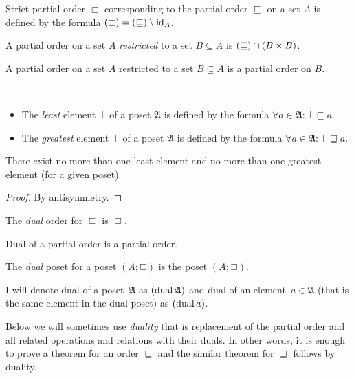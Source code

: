 \begin{defn}
Strict partial order $\sqsubset$ corresponding
to the partial order $\sqsubseteq$ on a set $A$ is defined by the
formula $\left(\mathord{\sqsubset}\right)=\left(\mathord{\sqsubseteq}\right)\setminus\operatorname{id}_{A}$.
\end{defn}

\begin{defn}
A partial order on a set $A$ \emph{restricted}
to a set $B\subseteq A$ is $\left(\mathord{\sqsubseteq}\right)\cap(B\times B)$.\end{defn}
\begin{obvious}
A partial order on a set $A$ restricted to a set $B\subseteq A$
is a partial order on $B$.\end{obvious}
\begin{defn}
~
\begin{itemize}
\item {}The \emph{least} element $\bot$ of a poset
$\mathfrak{A}$ is defined by the formula $\forall a\in\mathfrak{A}:\bot\sqsubseteq a$.
\item {}The \emph{greatest} element $\top$ of a
poset $\mathfrak{A}$ is defined by the formula $\forall a\in\mathfrak{A}:\top\sqsupseteq a$.
\end{itemize}
\end{defn}
\begin{prop}
There exist no more than one least element and no more than one greatest
element (for a given poset).\end{prop}
\begin{proof}
By antisymmetry.\end{proof}
\begin{defn}
The \emph{dual} order for $\sqsubseteq$ is $\sqsupseteq$.\end{defn}
\begin{obvious}
Dual of a partial order is a partial order.\end{obvious}
\begin{defn}
The \emph{dual} poset for a poset $(A;\mathord{\sqsubseteq})$
is the poset $(A;\mathord{\sqsupseteq})$.
\end{defn}
I will denote dual of a poset~$\mathfrak{A}$ as $(\operatorname{dual}\mathfrak{A})$
and dual of an element~$a\in\mathfrak{A}$ (that is the same element
in the dual poset) as $(\operatorname{dual} a)$.

Below we will sometimes use \emph{duality}
that is replacement of the partial order and all related operations
and relations with their duals. In other words, it is enough to prove
a theorem for an order $\sqsubseteq$ and the similar theorem for
$\sqsupseteq$ follows by duality.


